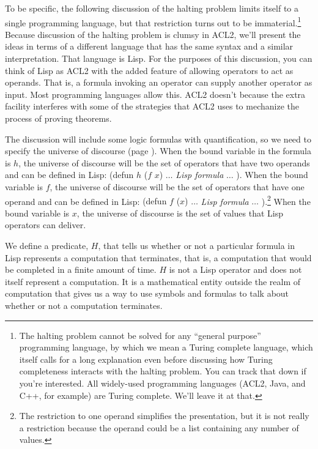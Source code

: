 To be specific, the following discussion of the halting problem
limits itself to a single programming language, but
that restriction turns out to be immaterial.\footnote{The
halting problem cannot be solved
for any ``general purpose'' programming language,
by which we mean a Turing complete language,
which itself calls for a long explanation even
before discussing how Turing completeness
interacts with the halting problem.
You can track that down if you're interested.
All widely-used programming languages
(ACL2, Java, and C++, for example) are Turing complete.
We'll leave it at that.}
Because discussion of the halting problem is clumsy in ACL2,
we'll present the ideas in terms of a different
language that has the same syntax
and a similar interpretation. That language is Lisp.
For the purposes of this discussion,
you can think of Lisp as ACL2 with the added feature
of allowing operators to act as operands.
That is, a formula invoking an operator can supply
another operator as input.
Most programming languages allow this.
ACL2 doesn't because the extra facility
interferes with some of the strategies that ACL2 uses
to mechanize the process of proving theorems.

The discussion will include some logic formulas with
quantification,
so we need to specify the universe of discourse
(page \pageref{def-universe-of-discourse}).
When the bound variable
in the formula is $h$, the universe of discourse
will be the set of operators that have
two operands and can be defined in Lisp:
\textsf{(defun $h$ ($f$ $x$)} $\dots$ \emph{Lisp formula} $\dots$ \textsf{)}.
When the bound variable is $f$,
the universe of discourse will be the set of operators
that have one operand and can be defined in Lisp:
\textsf{(defun $f$ ($x$)} $\dots$ \emph{Lisp formula} $\dots$ \textsf{)}.\footnote{The
restriction to one operand simplifies the presentation,
but it is not really a restriction because the operand could
be a list containing any number of values.}
When the bound variable is $x$, the universe of discourse
is the set of values that Lisp operators can deliver.

We define a predicate, $H$, that tells us whether or not
a particular formula in Lisp represents a computation that terminates,
that is, a computation that would be completed in a finite amount of time.
$H$ is not a Lisp operator and does not itself
represent a computation. It is a mathematical entity
outside the realm of computation that gives us a way
to use symbols and formulas to talk about
whether or not a computation terminates.

